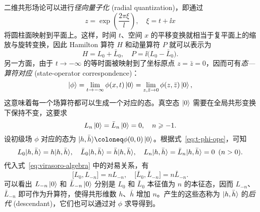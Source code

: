 二维共形场论可以进行\emph{径向量子化} (radial quantization)，即通过
\begin{equation}
  z = \exp\left( \frac{2\pi\xi}{l} \right), \quad \xi = t+\ii x
\end{equation}
将圆柱面映射到平面上。这样，时间 $t$、空间 $x$ 的平移变换就相当于复平面上的缩放与旋转变换，因此 Hamilton 算符 $H$ 和动量算符 $P$ 就可以表示为
\begin{equation}
  H = L_0+\bar{L}_0, \quad P = \ii \bigl( L_0-\bar{L}_0 \bigr).
\end{equation}
另一方面，由于 $t\to-\infty$ 的等时面被映射到了坐标原点 $z=\bar{z}=0$，因而可有\emph{态—算符对应} (state-operator correspondence)：
\begin{equation}
  \ket{\phi} = \lim_{t\to-\infty}\phi(x,t) \ket{0} = \lim_{z,\bar{z}\to 0} \phi(z,\bar{z}) \ket{0},
\end{equation}
这意味着每一个场算符都可以生成一个对应的态。真空态 $\ket{0}$ 需要在全局共形变换下保持不变，这要求
\begin{equation}
  L_n \ket{0} = \bar{L}_n \ket{0} = 0, \quad n \geqslant -1.
\end{equation}
设初级场 $\phi$ 对应的态为 $\ket*{h,\bar{h}}\coloneq\phi(0,0)\ket{0}$。根据式~\eqref{eq:t-phi-ope}，可知
\begin{equation}
  L_0       \ket*{h,\bar{h}} = h       \ket*{h,\bar{h}}, \quad
  \bar{L}_0 \ket*{h,\bar{h}} = \bar{h} \ket*{h,\bar{h}}, \quad
  L_n \ket*{h,\bar{h}} = \bar{L}_n \ket*{h,\bar{h}} = 0 \enspace (n > 0).
\end{equation}
代入式~\eqref{eq:virasoro-algebra} 中的对易关系，有
\begin{equation}
  \bigl[ L_0, L_{-n} \bigr] = n L_{-n}, \quad
  \bigl[ \bar{L}_0, \bar{L}_{-n} \bigr] = n \bar{L}_{-n}.
\end{equation}
可以看出 $L_{-n}\ket{0}$ 和 $\bar{L}_{-n}\ket{0}$ 分别是 $L_0$ 和 $\bar{L}_0$ 本征值为 $n$ 的本征态，因而 $L_{-n}$、$\bar{L}_{-n}$ 即可作为升算符，使得共形维数 $h$、$\bar{h}$ 增加 $n$。产生的这些态称为 $\ket*{h,\bar{h}}$ 的\emph{后代} (descendant)，它们也可以通过对 $\phi$ 求导得到。

